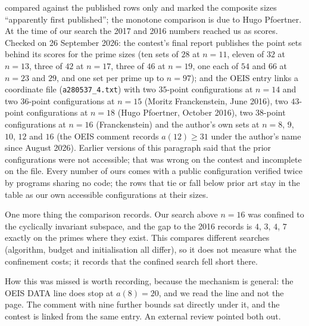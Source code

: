 \documentclass[11pt,a4paper]{article}
\begin{document}
compared against the published rows only and marked the composite sizes ``apparently first
published''; the monotone comparison is due to Hugo Pfoertner.  At the time of our search the 2017 and 2016
numbers reached us as scores.  Checked on 26 September 2026: the contest's final report publishes the point
sets behind its scores for the prime sizes (ten sets of $28$ at $n=11$, eleven of $32$ at $n=13$, three of $42$ at
$n=17$, three of $46$ at $n=19$, one each of $54$ and $66$ at $n=23$ and $29$, and one set per prime up to
$n=97$); and the OEIS entry links a coordinate file (\texttt{a280537\_4.txt}) with two $35$-point configurations
at $n=14$ and two $36$-point configurations at $n=15$ (Moritz Franckenstein, June 2016), two $43$-point
configurations at $n=18$ (Hugo Pfoertner, October 2016), two $38$-point configurations at $n=16$ (Franckenstein)
and the author's own sets at $n=8$, $9$, $10$, $12$ and $16$ (the OEIS comment records $a(12)\ge31$ under the
author's name since August 2026).  Earlier versions of this paragraph said that the prior configurations were
not accessible; that was wrong on the contest and incomplete on the file.  Every number of ours comes with a
public configuration verified twice by programs sharing no code; the rows that tie or fall below prior art stay
in the table as our own accessible configurations at their sizes.

One more thing the comparison records.  Our search above $n=16$ was confined to the cyclically
invariant subspace, and the gap to the 2016 records is $4$, $3$, $4$, $7$ exactly on the primes where
they exist.  This compares different searches (algorithm, budget and initialisation all differ), so it
does not measure what the confinement costs; it records that the confined search fell short there.

How this was missed is worth recording, because the mechanism is general: the OEIS DATA line
does stop at $a(8)=20$, and we read the line and not the page.  The comment with nine further
bounds sat directly under it, and the contest is linked from the same entry.  An external
review pointed both out.
\end{document}
